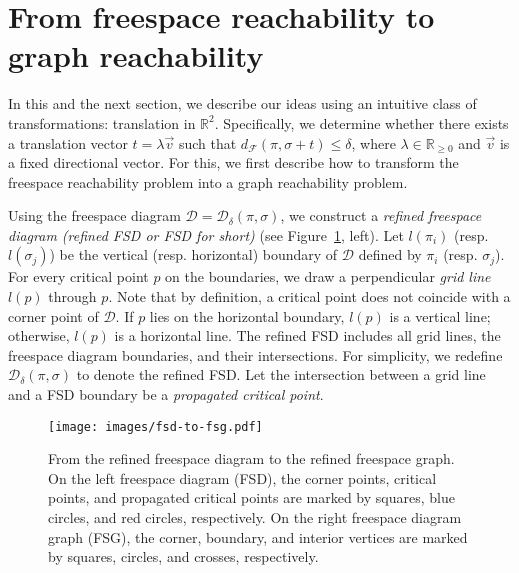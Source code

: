 \documentclass[thm-restate]{lipics-v2021}
\theoremstyle{remark}
\newcommand{\df}[1]{d_{\mathcal{F}}(#1)}
\newcommand{\fd}[2]{\mathcal{D}_{#2}(#1)}
\newcommand{\D}{\mathcal{D}}
\newcommand{\reals}[0]{\mathbb{R}}
\begin{document}
\section{From freespace reachability to graph reachability} \label{sec:fs-reach-to-fsg-reach}

In this and the next section, 
we describe our ideas using an intuitive class of transformations: translation in $\reals^2$. Specifically, we determine whether there exists a translation vector $t = \lambda \Vec{v}$ such that $\df{\pi, \sigma + t} \leq \delta$, where $\lambda \in \reals_{\geq 0}$ and $\Vec{v}$ is a fixed directional vector. For this, we first describe how to transform the freespace reachability problem into a graph reachability problem. 

\sloppy Using the freespace diagram $\D = \fd{\pi, \sigma}{\delta}$, we construct a \emph{refined freespace diagram (refined FSD or FSD for short)} (see Figure~\ref{fig:fsd-to-fsg}, left). Let $l(\pi_i)$ (resp. $l(\sigma_j)$) be the vertical (resp. horizontal) boundary of $\D$ defined by $\pi_i$ (resp. $\sigma_j$).  For every critical point $p$ on the boundaries, we draw a perpendicular \emph{grid line} $l(p)$ through $p$. Note that by definition, a critical point does not coincide with a corner point of $\D$. If $p$ lies on the horizontal boundary, $l(p)$ is a vertical line; otherwise, $l(p)$ is a horizontal line. The refined FSD includes all grid lines, the freespace diagram boundaries, and their intersections. For simplicity, we redefine $\fd{\pi, \sigma}{\delta}$ to denote the refined FSD. Let the intersection between a grid line and a FSD boundary be a \emph{propagated critical point}. 

\begin{figure}[tbh]
    \centering
    \texttt{[image: images/fsd-to-fsg.pdf]}
    \caption{From the refined freespace diagram to the refined freespace graph. On the left freespace diagram (FSD), the corner points, critical points, and propagated critical points are marked by squares, blue circles, and red circles, respectively. On the right freespace diagram graph (FSG), the corner, boundary, and interior vertices are marked by squares, circles, and crosses, respectively.}
    \label{fig:fsd-to-fsg}
\end{figure}
\end{document}
